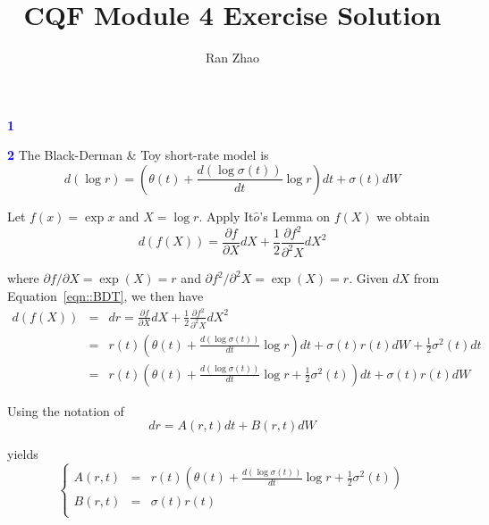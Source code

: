 \documentclass[a4paper,11pt] {article}
\author{Ran Zhao}
\title{CQF Module 4 Exercise Solution}
\date{}
\begin{document}
\maketitle


\textcolor{blue}{\bf 1 }

\textcolor{blue}{\bf 2 } The Black-Derman \& Toy short-rate model is
\begin{equation} \label{eqn::BDT}
d(\log r) = \left( \theta(t) + \frac{d(\log\sigma(t))}{dt} \log r \right) dt + \sigma(t) dW
\end{equation}

Let $f(x) = \exp x$ and $X = \log r$. Apply It$\hat{o}$'s Lemma on $f(X)$ we obtain
$$
d(f(X)) = \frac{\partial f}{\partial X} dX + \frac{1}{2} \frac{\partial f^2}{\partial^2 X} dX^2
$$

where $\partial f / \partial X = \exp(X) = r$ and $\partial f^2 / \partial^2 X = \exp(X) = r$. Given $dX$ from Equation~\ref{eqn::BDT}, we then have
\begin{eqnarray*}
d(f(X)) &=& dr =  \frac{\partial f}{\partial X} dX + \frac{1}{2} \frac{\partial f^2}{\partial^2 X} dX^2 \\
        &=& r(t)\left( \theta(t) + \frac{d(\log\sigma(t))}{dt} \log r \right) dt + \sigma(t)r(t) dW + \frac{1}{2}\sigma^2(t) dt \\
        &=& r(t)\left( \theta(t) + \frac{d(\log\sigma(t))}{dt} \log r + \frac{1}{2} \sigma^2(t) \right) dt + \sigma(t)r(t) dW
\end{eqnarray*}

Using the notation of 
$$
dr = A(r,t)dt + B(r,t)dW
$$

yields
$$
\left\{
  \begin{array}{rcr}
    A(r,t) & = & r(t)\left( \theta(t) + \frac{d(\log\sigma(t))}{dt} \log r + \frac{1}{2} \sigma^2(t) \right) \\
    B(r,t) & = & \sigma(t)r(t) \\
  \end{array}
\right.
$$
\end{document}
